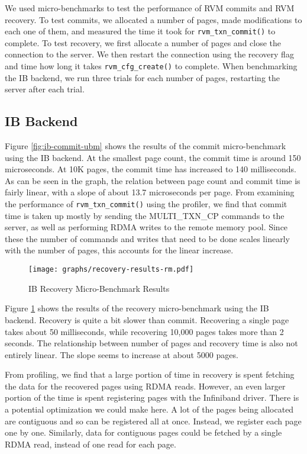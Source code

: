 
We used micro-benchmarks to test the performance of RVM commits and RVM
recovery. To test commits, we allocated a number of pages, made modifications
to each one of them, and measured the time it took for \verb|rvm_txn_commit()|
to complete. To test recovery, we first allocate a number of pages and
close the connection to the server. We then restart the connection using the
recovery flag and time how long it takes \verb|rvm_cfg_create()| to complete.
When benchmarking the IB backend, we run three trials for each number of pages,
restarting the server after each trial.

\subsection{IB Backend}
Figure \ref{fig:ib-commit-ubm} shows the results of the commit micro-benchmark
using the IB backend. At the smallest page count, the commit time is around
150 microseconds. At 10K pages, the commit time has increased to 140 milliseconds.
As can be seen in the graph, the relation between page count and commit time
is fairly linear, with a slope of about 13.7 microseconds per page.
From examining the performance of \verb|rvm_txn_commit()| using the profiler,
we find that commit time is taken up mostly by sending the MULTI\_TXN\_CP
commands to the server, as well as performing RDMA writes to the remote memory pool.
Since these the number of commands and writes that need to be done scales
linearly with the number of pages, this accounts for the linear increase.


\begin{figure}[t!]
    \caption{IB Recovery Micro-Benchmark Results}
    \texttt{[image: graphs/recovery-results-rm.pdf]}
    \label{fig:ib-recovery-ubm}
\end{figure}

Figure \ref{fig:ib-recovery-ubm} shows the results of the recovery
micro-benchmark using the IB backend. Recovery is quite a bit slower than
commit. Recovering a single page takes about 50 milliseconds, while recovering
10,000 pages takes more than 2 seconds. The relationship between number of
pages and recovery time is also not entirely linear. The slope seems to
increase at about 5000 pages.

From profiling, we find that a large portion of time in recovery is spent
fetching the data for the recovered pages using RDMA reads. However, an even
larger portion of the time is spent registering pages with the Infiniband
driver. There is a potential optimization we could make here. A lot of the
pages being allocated are contiguous and so can be registered all at once.
Instead, we register each page one by one. Similarly, data for contiguous
pages could be fetched by a single RDMA read, instead of one read for each page.

